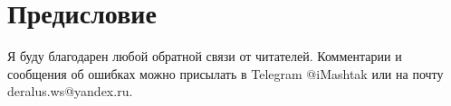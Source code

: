 \maketitle
\tableofcontents
\clearpage

\chapter*{Предисловие}

Я буду благодарен любой обратной связи от читателей. Комментарии и сообщения об ошибках можно присылать в Telegram @iMashtak или на почту deralus.ws@yandex.ru.






% 

{}


